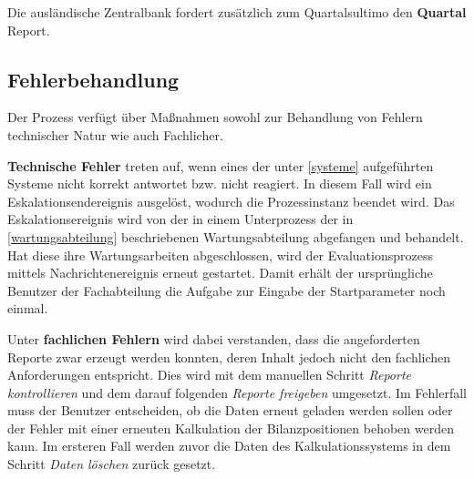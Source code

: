 \label{quartal}
\smallskip
\noindent Die ausländische Zentralbank fordert zusätzlich zum Quartalsultimo den \textbf{Quartal} Report.

\subsection{Fehlerbehandlung}
\label{fehlerbehandlung}
Der Prozess verfügt über Maßnahmen sowohl zur Behandlung von Fehlern technischer Natur wie auch Fachlicher. 

\label{techFehler}
\noindent\textbf{Technische Fehler} treten auf, wenn eines der unter \ref{systeme} aufgeführten Systeme nicht korrekt antwortet bzw. nicht reagiert. In diesem Fall wird ein Eskalationsendereignis ausgelöst, wodurch die Prozessinstanz beendet wird. Das Eskalationsereignis wird von der in einem Unterprozess der in \ref{wartungsabteilung} beschriebenen Wartungsabteilung abgefangen und behandelt. Hat diese ihre Wartungsarbeiten abgeschlossen, wird der Evaluationsprozess mittels Nachrichtenereignis erneut gestartet. Damit erhält der ursprüngliche Benutzer der Fachabteilung die Aufgabe zur Eingabe der Startparameter noch einmal.

\label{fachFehler}
\noindent Unter \textbf{fachlichen Fehlern} wird dabei verstanden, dass die angeforderten Reporte zwar erzeugt werden konnten, deren Inhalt jedoch nicht den fachlichen Anforderungen entspricht. Dies wird mit dem manuellen Schritt \textit{Reporte kontrollieren} und dem darauf folgenden \textit{Reporte freigeben} umgesetzt. Im Fehlerfall muss der Benutzer entscheiden, ob die Daten erneut geladen werden sollen oder der Fehler mit einer erneuten Kalkulation der Bilanzpositionen behoben werden kann. Im ersteren Fall werden zuvor die Daten des Kalkulationssystems in dem Schritt \textit{Daten löschen} zurück gesetzt.













